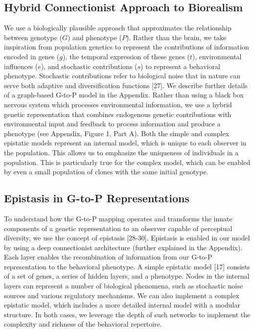 \documentclass{article}
\begin{document}
\subsection{Hybrid Connectionist Approach to Biorealism}
We use a biologically plausible approach that approximates the relationship between genotype ($G$) and phenotype ($P$). Rather than the brain, we take inspiration from population genetics to represent the contributions of information encoded in genes ($g$), the temporal expression of these genes ($t$), environmental influences ($e$), and stochastic contributions ($s$) to represent a behavioral phenotype. Stochastic contributions refer to biological noise that in nature can serve both adaptive and diversification functions [27]. We describe further details of a graph-based G-to-P model in the Appendix. Rather than using a black box nervous system which processes environmental information, we use a hybrid genetic representation that combines endogenous genetic contributions with environmental input and feedback to process information and produce a phenotype (see Appendix, Figure 1, Part A). Both the simple and complex epistatic models represent an internal model, which is unique to each observer in the population. This allows us to emphasize the uniqueness of individuals in a population. This is particularly true for the complex model, which can be enabled by even a small population of clones with the same initial genotype. 

\subsection{Epistasis in G-to-P Representations}
To understand how the G-to-P mapping operates and transforms the innate components of a genetic representation to an observer capable of perceptual diversity, we use the concept of epistasis [28-30]. Epistasis is enabled in our model by using a deep connectionist architecture (further explained in the Appendix). Each layer enables the recombination of information from our G-to-P representation to the behavioral phenotype. A simple epistatic model [17] consists of a set of genes, a series of hidden layers, and a phenotype. Nodes in the internal layers can represent a number of biological phenomena, such as stochastic noise sources and various regulatory mechanisms. We can also implement a complex epistatic model, which includes a more detailed internal model with a modular structure. In both cases, we leverage the depth of such networks to implement the complexity and richness of the behavioral repertoire.
\end{document}
